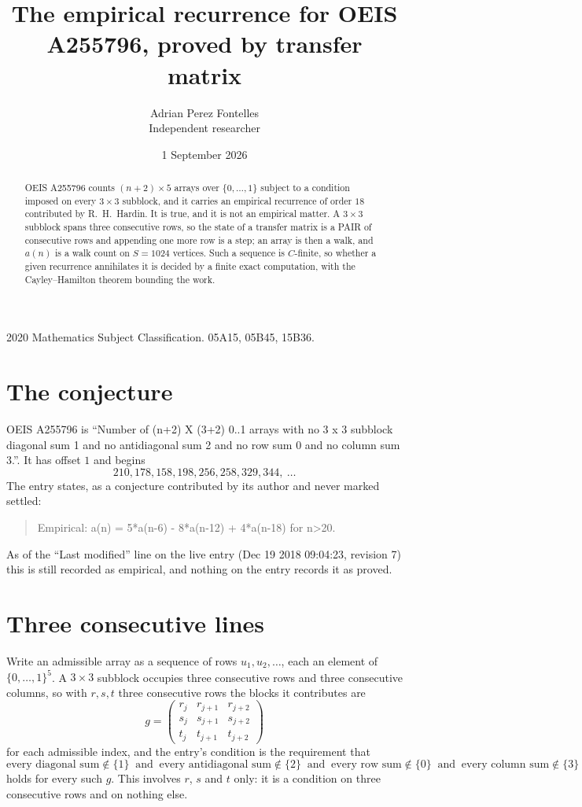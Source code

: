 \documentclass[11pt,a4paper]{article}
\title{The empirical recurrence for OEIS A255796, proved by transfer matrix}
\author{Adrian Perez Fontelles\\ \small Independent researcher}
\date{1 September 2026}
\theoremstyle{plain}
\theoremstyle{definition}
\begin{document}
\maketitle

\begin{abstract}
OEIS A255796 counts $(n+2)\times5$ arrays over $\{0,\dots,1\}$ subject to a condition imposed on
every $3\times3$ subblock, and it carries an empirical recurrence of order $18$
contributed by R.~H.~Hardin. It is true, and it is not an empirical matter. A $3\times3$
subblock spans three consecutive rows, so the state of a transfer matrix is a PAIR of
consecutive rows and appending one more row is a step; an array is then a walk, and
$a(n)$ is a walk count on $S=1024$ vertices. Such a sequence is $C$-finite, so whether a given
recurrence annihilates it is decided by a finite exact computation, with the Cayley--Hamilton
theorem bounding the work.
\end{abstract}

\noindent\small 2020 Mathematics Subject Classification. 05A15, 05B45, 15B36.\normalsize

\section{The conjecture}

OEIS A255796 is ``Number of (n+2) X (3+2) 0..1 arrays with no 3 x 3 subblock diagonal sum 1 and no antidiagonal sum 2 and no row sum 0 and no column sum 3.''. It has offset $1$ and begins
\[
210, 178, 158, 198, 256, 258, 329, 344,\ \dots
\]
The entry states, as a conjecture contributed by its author and never marked settled:
\begin{quote}
Empirical: a(n) = 5*a(n-6) - 8*a(n-12) + 4*a(n-18) for n>20.
\end{quote}
As of the ``Last modified'' line on the live entry (Dec 19 2018 09:04:23, revision 7) this is still
recorded as empirical, and nothing on the entry records it as proved.

\section{Three consecutive lines}

Write an admissible array as a sequence of rows $u_1,u_2,\dots$, each an element of
$\{0,\dots,1\}^{5}$. A $3\times3$ subblock occupies three consecutive rows and
three consecutive columns, so with $r,s,t$ three consecutive rows the blocks it
contributes are
\[
g=\begin{pmatrix}r_j&r_{j+1}&r_{j+2}\\ s_j&s_{j+1}&s_{j+2}\\ t_j&t_{j+1}&t_{j+2}\end{pmatrix}
\]
for each admissible index, and the entry's condition is the requirement that
\[
\text{every diagonal sum} \notin \{1\}\ \text{ and }\ \text{every antidiagonal sum} \notin \{2\}\ \text{ and }\ \text{every row sum} \notin \{0\}\ \text{ and }\ \text{every column sum} \notin \{3\}
\]
holds for every such $g$. This involves $r$, $s$ and $t$ only: it is a condition on
three consecutive rows and on nothing else.
\end{document}
